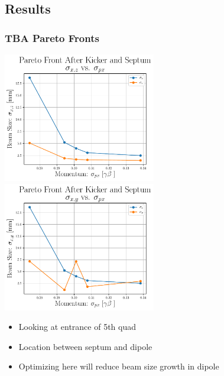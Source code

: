 \documentclass[professionalfonts,t]{beamer}
\begin{document}
\subsection{Results}
\begin{frame}
	\frametitle{TBA Pareto Fronts}
	\includegraphics[width=0.5\textwidth]{../../tex/images/xz_vs_px_pareto_front_Q5}%
	\includegraphics[width=0.5\textwidth]{../../tex/images/xy_vs_px_pareto_front_Q5}%
	\begin{itemize}
		\item Looking at entrance of 5th quad
		\item Location between septum and dipole
		\item Optimizing here will reduce beam size growth in dipole
	\end{itemize}
\end{frame}
\end{document}
